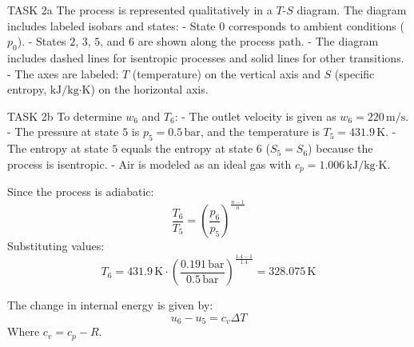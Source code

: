TASK 2a  
The process is represented qualitatively in a \( T \)-\( S \) diagram. The diagram includes labeled isobars and states:  
- State \( 0 \) corresponds to ambient conditions (\( p_0 \)).  
- States \( 2 \), \( 3 \), \( 5 \), and \( 6 \) are shown along the process path.  
- The diagram includes dashed lines for isentropic processes and solid lines for other transitions.  
- The axes are labeled: \( T \) (temperature) on the vertical axis and \( S \) (specific entropy, \( \text{kJ/kg·K} \)) on the horizontal axis.  

TASK 2b  
To determine \( w_6 \) and \( T_6 \):  
- The outlet velocity is given as \( w_6 = 220 \, \text{m/s} \).  
- The pressure at state \( 5 \) is \( p_5 = 0.5 \, \text{bar} \), and the temperature is \( T_5 = 431.9 \, \text{K} \).  
- The entropy at state \( 5 \) equals the entropy at state \( 6 \) (\( S_5 = S_6 \)) because the process is isentropic.  
- Air is modeled as an ideal gas with \( c_p = 1.006 \, \text{kJ/kg·K} \).  

Since the process is adiabatic:  
\[
\frac{T_6}{T_5} = \left( \frac{p_6}{p_5} \right)^{\frac{n-1}{n}}
\]  
Substituting values:  
\[
T_6 = 431.9 \, \text{K} \cdot \left( \frac{0.191 \, \text{bar}}{0.5 \, \text{bar}} \right)^{\frac{1.4-1}{1.4}} = 328.075 \, \text{K}
\]  

The change in internal energy is given by:  
\[
u_6 - u_5 = c_v \Delta T
\]  
Where \( c_v = c_p - R \).